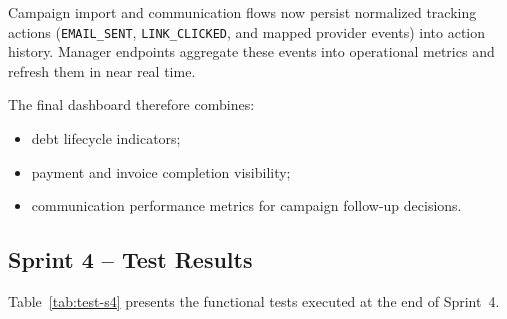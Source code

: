 \documentclass[12pt,a4paper]{report}
\begin{document}
Campaign import and communication flows now persist normalized tracking actions
(\texttt{EMAIL\_SENT}, \texttt{LINK\_CLICKED}, and mapped provider events) into action
history.
Manager endpoints aggregate these events into operational metrics and refresh them in
near real time.

The final dashboard therefore combines:
\begin{itemize}
  \item debt lifecycle indicators;
  \item payment and invoice completion visibility;
  \item communication performance metrics for campaign follow-up decisions.
\end{itemize}

\FloatBarrier

\subsection{Sprint 4 -- Test Results}

Table~\ref{tab:test-s4} presents the functional tests executed at the end of Sprint~4.
\end{document}
